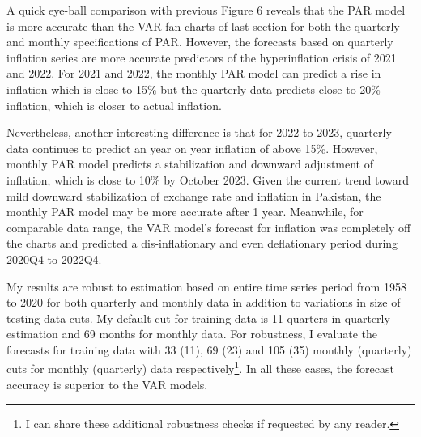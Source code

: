 \documentclass[12pt]{article}
\newcommand{\1}{\mathbbm 1}
\begin{document}
		
		
		
		
		
		
		
		
		A quick eye-ball comparison with previous Figure 6 reveals that the PAR model is more accurate than the VAR fan charts of last section for both the quarterly and monthly specifications of PAR. However, the forecasts based on quarterly inflation series are more accurate predictors of the hyperinflation crisis of 2021 and 2022. For 2021 and 2022, the monthly PAR model can predict a rise in inflation which is close to 15\% but the quarterly data predicts close to 20\% inflation, which is closer to actual inflation. 
		
		Nevertheless, another interesting difference is that for 2022 to 2023, quarterly data continues to predict an year on year inflation of above 15\%. However, monthly PAR model predicts a stabilization and downward adjustment of inflation, which is close to 10\% by October 2023. Given the current trend toward mild downward stabilization of exchange rate and inflation in Pakistan, the monthly PAR model may be more accurate after 1 year. Meanwhile, for comparable data range, the VAR model's forecast for inflation was completely off the charts and predicted a dis-inflationary and even deflationary period during 2020Q4 to 2022Q4.
		
		My results are robust to estimation based on entire time series period from 1958 to 2020 for both quarterly and monthly data in addition to variations in size of testing data cuts. My default cut for training data is 11 quarters in quarterly estimation and 69 months for monthly data. For robustness, I evaluate the forecasts for training data with 33 (11), 69 (23) and 105 (35) monthly (quarterly) cuts for monthly (quarterly) data respectively\footnote{I can share these additional robustness checks if requested by any reader.}. In all these cases, the forecast accuracy is superior to the VAR models.
		
		
		
		
		
		
		
		
		
		
		
		
		
		
		
		
		
		
		
		
		
	
		
		
		
\end{document}
